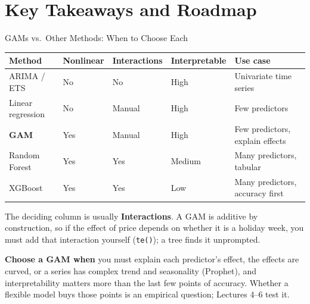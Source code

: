 \documentclass[aspectratio=169, 11pt]{beamer}
\begin{document}
\section{Key Takeaways and Roadmap}


\begin{frame}{GAMs vs.\ Other Methods: When to Choose Each}
  \begin{center}
    {\small
    \begin{tabular}{lllll}
      \toprule
      \textbf{Method} & \textbf{Nonlinear} & \textbf{Interactions} & \textbf{Interpretable} & \textbf{Use case} \\
      \midrule
      ARIMA / ETS       & No  & No     & High   & Univariate time series \\
      Linear regression & No  & Manual & High   & Few predictors \\
      \textbf{GAM}      & Yes & Manual & High   & Few predictors, explain effects \\
      Random Forest     & Yes & Yes    & Medium & Many predictors, tabular \\
      XGBoost           & Yes & Yes    & Low    & Many predictors, accuracy first \\
      \bottomrule
    \end{tabular}
    }
  \end{center}

  \vspace{0.15cm}
  The deciding column is usually \textbf{Interactions}. A GAM is additive by construction, so
  if the effect of price depends on whether it is a holiday week, you must add that interaction
  yourself (\texttt{te()}); a tree finds it unprompted.

  \vspace{0.15cm}
  \textbf{Choose a GAM when} you must explain each predictor's effect, the effects are curved,
  or a series has complex trend and seasonality (Prophet), and interpretability matters more
  than the last few points of accuracy. Whether a flexible model buys those points is an
  empirical question; Lectures 4--6 test it.
\end{frame}
\end{document}
